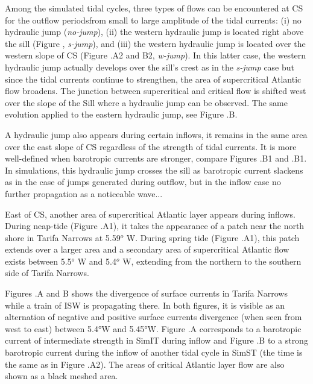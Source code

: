 Among the simulated tidal cycles, three types of flows can be encountered at CS for the outflow periods\color{red}from small to large amplitude of the tidal currents\color{black}: (i) no hydraulic jump (\textit{no-jump}), (ii) the western hydraulic jump is located right above the sill (Figure , \textit{s-jump}), and (iii) the western hydraulic jump is located over the western slope of CS (Figure .A2 and B2, \textit{w-jump}). In this latter case, the western hydraulic jump actually develops over the sill's crest as in the \textit{s-jump} case but since the tidal currents continue to strengthen, the area of supercritical Atlantic flow broadens. The junction between supercritical and critical flow is shifted west over the slope of the Sill where a hydraulic jump can be observed. The same evolution applied to the eastern hydraulic jump, see Figure .B. 

A hydraulic jump also appears during \color{red}certain \color{black}inflows, it remains in the same area over the east slope of CS regardless of the strength of tidal currents. It is more well-defined when barotropic currents are stronger, compare Figures .B1 and .B1. \color{red}In simulations, this hydraulic jump crosses the sill as barotropic current slackens as in the case of jumps generated during outflow, but in the inflow case no further propagation as a noticeable wave...\color{black}

East of CS, another area of supercritical Atlantic layer appears during inflows. During neap-tide (Figure .A1), it takes the appearance of a patch near the north shore in Tarifa Narrows at 5.59$^o$ W. During spring tide (Figure .A1), this patch extends over a larger area and a secondary area of supercritical Atlantic flow exists between 5.5$^o$ W and 5.4$^o$ W, extending from the northern to the southern side of Tarifa Narrows. 

Figures .A and B shows the divergence of surface currents in Tarifa Narrows while a train of ISW is propagating there. In both figures, it is visible as an alternation of negative and positive surface currents divergence (when seen from west to east) between 5.4°W and 5.45°W. Figure .A corresponds to a barotropic current of intermediate strength in SimIT during inflow and Figure .B to a strong barotropic current during the inflow of another tidal cycle in SimST (the time is the same as in Figure .A2). The areas of critical Atlantic layer flow are also shown as a black meshed area. 

